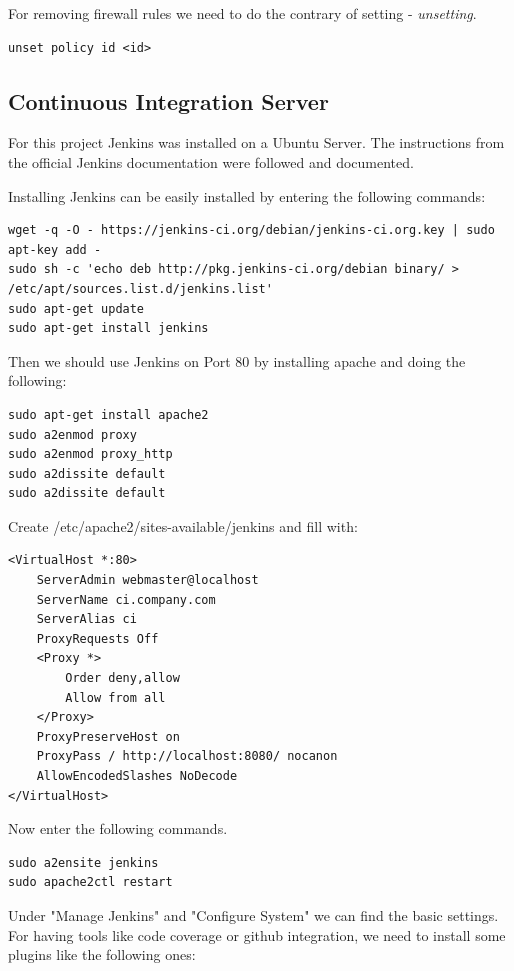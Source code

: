 \documentclass[11pt, a4paper]{article}
\begin{document}
For removing firewall rules we need to do the contrary of setting - \textit{unsetting}.

\begin{lstlisting}
unset policy id <id> 
\end{lstlisting}


\subsection{Continuous Integration Server}

For this project Jenkins was installed on a Ubuntu Server. The instructions from the official Jenkins documentation \cite{jenkins:ubuntu} were followed and documented. 

Installing Jenkins can be easily installed by entering the following commands: 

\begin{lstlisting}
wget -q -O - https://jenkins-ci.org/debian/jenkins-ci.org.key | sudo apt-key add -
sudo sh -c 'echo deb http://pkg.jenkins-ci.org/debian binary/ > /etc/apt/sources.list.d/jenkins.list'
sudo apt-get update
sudo apt-get install jenkins 
\end{lstlisting}

Then we should use Jenkins on Port 80 by installing apache and doing the following:

\begin{lstlisting}
sudo apt-get install apache2
sudo a2enmod proxy
sudo a2enmod proxy_http
sudo a2dissite default
sudo a2dissite default
\end{lstlisting}

Create /etc/apache2/sites-available/jenkins and fill with:
\begin{lstlisting}
<VirtualHost *:80>
	ServerAdmin webmaster@localhost
	ServerName ci.company.com
	ServerAlias ci
	ProxyRequests Off
	<Proxy *>
		Order deny,allow
		Allow from all
	</Proxy>
	ProxyPreserveHost on
	ProxyPass / http://localhost:8080/ nocanon
	AllowEncodedSlashes NoDecode
</VirtualHost> 
\end{lstlisting}


Now enter the following commands. 

\begin{lstlisting}
sudo a2ensite jenkins
sudo apache2ctl restart
\end{lstlisting}


Under "Manage Jenkins" and "Configure System" we can find the basic settings.
For having tools like code coverage or github integration, we need to install some plugins like the following ones:
\end{document}
